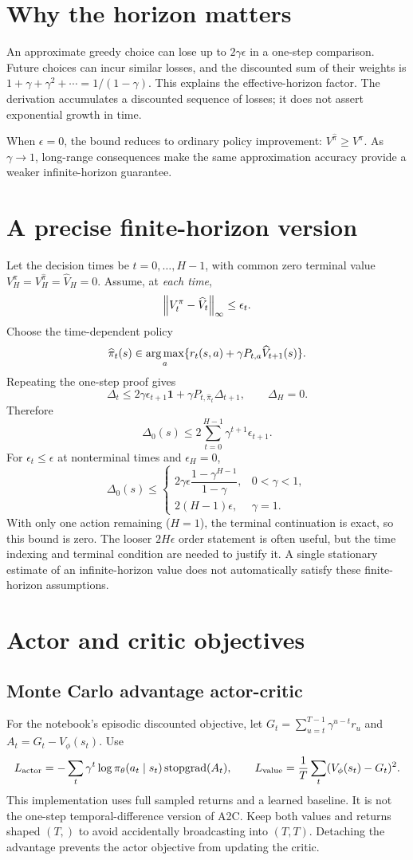 \newpage
\section{Why the horizon matters}
An approximate greedy choice can lose up to $2\gamma\epsilon$ in a one-step
comparison. Future choices can incur similar losses, and the discounted
sum of their weights is $1+\gamma+\gamma^2+\cdots=1/(1-\gamma)$. This
explains the effective-horizon factor. The derivation accumulates a
discounted sequence of losses; it does not assert exponential growth in time.

When $\epsilon=0$, the bound reduces to ordinary policy improvement:
$V^{\widehat\pi}\geq V^\pi$. As $\gamma\to1$, long-range consequences
make the same approximation accuracy provide a weaker infinite-horizon guarantee.

\section{A precise finite-horizon version}
Let the decision times be $t=0,\ldots,H-1$, with common zero terminal value
$V_H^\pi=V_H^{\widehat\pi}=\widehat V_H=0$. Assume, at \emph{each time},
\[
 \left\lVert V_t^\pi-\widehat V_t\right\rVert_\infty\leq\epsilon_t.
\]
Choose the time-dependent policy
\[
 \widehat\pi_t(s)\in\operatorname*{arg\,max}_a
       \{r_t(s,a)+\gamma P_{t,a}\widehat V_{t+1}(s)\}.
\]
Repeating the one-step proof gives
\[
 \Delta_t\leq2\gamma\epsilon_{t+1}\mathbf1
                 +\gamma P_{t,\widehat\pi_t}\Delta_{t+1},\qquad\Delta_H=0.
\]
Therefore
\[
 \boxed{\Delta_0(s)\leq2\sum_{t=0}^{H-1}\gamma^{t+1}\epsilon_{t+1}.}
\]
For $\epsilon_t\leq\epsilon$ at nonterminal times and $\epsilon_H=0$,
\[
 \Delta_0(s)\leq
 \begin{cases}
 2\gamma\epsilon\dfrac{1-\gamma^{H-1}}{1-\gamma},&0<\gamma<1,\\[5pt]
 2(H-1)\epsilon,&\gamma=1.
 \end{cases}
\]
With only one action remaining ($H=1$), the terminal continuation is exact,
so this bound is zero. The looser $2H\epsilon$ order statement is often
useful, but the time indexing and terminal condition are needed to justify it.
A single stationary estimate of an infinite-horizon value does not automatically
satisfy these finite-horizon assumptions.

\newpage
\section{Actor and critic objectives}
\subsection{Monte Carlo advantage actor-critic}
For the notebook's episodic discounted objective, let
$G_t=\sum_{u=t}^{T-1}\gamma^{u-t}r_u$ and $A_t=G_t-V_\phi(s_t)$. Use
\[
 L_{\rm actor}=-\sum_t\gamma^t\log\pi_\theta(a_t\mid s_t)\operatorname{stopgrad}(A_t),\qquad
 L_{\rm value}=\frac1T\sum_t(V_\phi(s_t)-G_t)^2.
\]
This implementation uses full sampled returns and a learned baseline. It
is not the one-step temporal-difference version of A2C. Keep both values and
returns shaped $(T,)$ to avoid accidentally broadcasting into $(T,T)$.
Detaching the advantage prevents the actor objective from updating the critic.

